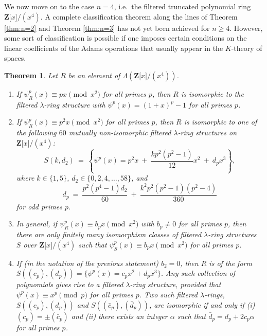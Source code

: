 \documentclass[reqno,11pt]{amsart}
\numberwithin{equation}{subsection}  %
\newtheorem{thm}[subsection]{Theorem}
\newcommand{\bZ}{\mathbf{Z}}
\begin{document}


We now move on to the case $n = 4$, i.e.\ the filtered truncated polynomial ring $\bZ \lbrack x \rbrack/(x^4)$.  A complete classification theorem along the lines of Theorem \ref{thm:n=2} and Theorem \ref{thm:n=3} has not yet been achieved for $n \geq 4$.  However, some sort of classification is possible if one imposes certain conditions on the linear coefficients of the Adams operations that usually appear in the $K$-theory of spaces.


\medskip
\begin{thm}
\label{thm:n=4}
Let $R$ be an element of $\Lambda(\bZ \lbrack x \rbrack/(x^4))$.  
   \begin{enumerate}
   \item If $\psi^p_R(x) \equiv px \pmod{x^2}$ for all primes $p$, then $R$ is isomorphic to the  filtered $\lambda$-ring structure with $\psi^p(x) = (1 + x)^p - 1$ for all primes $p$.
\medskip
   \item If $\psi^p_R(x) \equiv p^2x \pmod{x^2}$ for all primes $p$, then $R$ is isomorphic to one of the following $60$ mutually non-isomorphic filtered $\lambda$-ring structures on $\bZ \lbrack x \rbrack/(x^4)$:
     \[
     S(k, d_2) ~=~ \left\lbrace \psi^p(x) = p^2x ~+~ \frac{kp^2(p^2 - 1)}{12}x^2 ~+~ d_px^3 \right\rbrace,
     \]
where $k \in \lbrace 1, 5 \rbrace$, $d_2 \in \lbrace 0, 2, 4, \ldots, 58 \rbrace$, and 
     \begin{equation}
     \label{eq:d_p}
     d_p ~=~ \frac{p^2(p^4 - 1)d_2}{60} 
             ~+~ \frac{k^2p^2(p^2 - 1)(p^2 - 4)}{360}
     \end{equation}
for odd primes $p$.
   \item In general, if $\psi^p_R(x) \equiv b_p x \pmod{x^2}$ with $b_p \not= 0$ for all primes $p$, then there are only finitely many isomorphism classes of filtered $\lambda$-ring structures $S$ over $\bZ \lbrack x \rbrack/(x^4)$ such that $\psi^p_S(x) \equiv b_p x \pmod{x^2}$ for all primes $p$.
   \item If (in the notation of the previous statement) $b_2 = 0$, then $R$ is  of the form $S((c_p), (d_p)) = \lbrace \psi^p(x) = c_p x^2 + d_p x^3 \rbrace$.  Any such collection of polynomials gives rise to a filtered $\lambda$-ring structure, provided that $\psi^p(x) \equiv x^p \pmod{p}$ for all primes $p$.  Two such filtered $\lambda$-rings, $S((c_p), (d_p))$ and $S((\bar{c}_p), (\bar{d}_p))$, are isomorphic if and only if (i) $(c_p) = \pm (\bar{c}_p)$ and (ii) there exists an integer $\alpha$ such that $\bar{d}_p = d_p + 2c_p \alpha$ for all primes $p$.
   \end{enumerate}
\end{thm}
\end{document}
